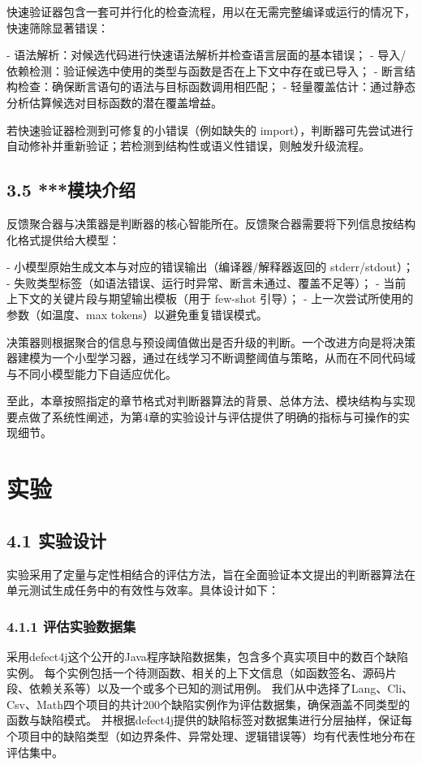 快速验证器包含一套可并行化的检查流程，用以在无需完整编译或运行的情况下，快速筛除显著错误：

- 语法解析：对候选代码进行快速语法解析并检查语言层面的基本错误；
- 导入/依赖检测：验证候选中使用的类型与函数是否在上下文中存在或已导入；
- 断言结构检查：确保断言语句的语法与目标函数调用相匹配；
- 轻量覆盖估计：通过静态分析估算候选对目标函数的潜在覆盖增益。 

若快速验证器检测到可修复的小错误（例如缺失的 import），判断器可先尝试进行自动修补并重新验证；若检测到结构性或语义性错误，则触发升级流程。

\subsection{3.5 ***模块介绍}

反馈聚合器与决策器是判断器的核心智能所在。反馈聚合器需要将下列信息按结构化格式提供给大模型：

- 小模型原始生成文本与对应的错误输出（编译器/解释器返回的 stderr/stdout）；
- 失败类型标签（如语法错误、运行时异常、断言未通过、覆盖不足等）；
- 当前上下文的关键片段与期望输出模板（用于 few-shot 引导）；
- 上一次尝试所使用的参数（如温度、max tokens）以避免重复错误模式。 

决策器则根据聚合的信息与预设阈值做出是否升级的判断。一个改进方向是将决策器建模为一个小型学习器，通过在线学习不断调整阈值与策略，从而在不同代码域与不同小模型能力下自适应优化。 

至此，本章按照指定的章节格式对判断器算法的背景、总体方法、模块结构与实现要点做了系统性阐述，为第4章的实验设计与评估提供了明确的指标与可操作的实现细节。


\section{实验}
\subsection{4.1 实验设计}
实验采用了定量与定性相结合的评估方法，旨在全面验证本文提出的判断器算法在单元测试生成任务中的有效性与效率。具体设计如下：

\subsubsection{4.1.1 评估实验数据集}
采用defect4j这个公开的Java程序缺陷数据集，包含多个真实项目中的数百个缺陷实例。
每个实例包括一个待测函数、相关的上下文信息（如函数签名、源码片段、依赖关系等）以及一个或多个已知的测试用例。
我们从中选择了Lang、Cli、Csv、Math四个项目的共计200个缺陷实例作为评估数据集，确保涵盖不同类型的函数与缺陷模式。
并根据defect4j提供的缺陷标签对数据集进行分层抽样，保证每个项目中的缺陷类型（如边界条件、异常处理、逻辑错误等）均有代表性地分布在评估集中。


